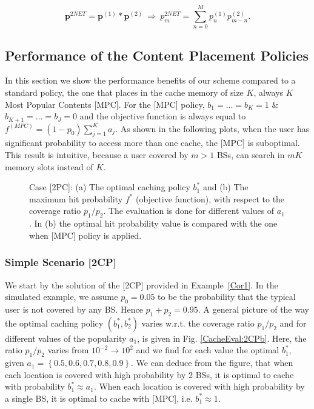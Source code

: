 \documentclass[conference,twocolum,final]{IEEEtran}
\begin{document}
\begin{equation}
\label{2Net}
\mathbf{p}^{2NET} = \mathbf{p}^{(1)}*\mathbf{p}^{(2)} \ \Rightarrow \  p_m^{2NET} = \sum_{n=0}^M p_n^{(1)}p_{m-n}^{(2)}.
\end{equation}


\subsection{Performance of the Content Placement Policies}
In this section 
we show the performance benefits of our scheme compared to a standard policy, the one that places in the cache memory of size $K$, always $K$ Most Popular Contents [MPC]. For the [MPC] policy, $b_1=\ldots=b_K=1$ $\&$ $b_{K+1}=\ldots=b_J=0$ and the objective function is always equal to $f^{(MPC)}=(1-p_0)\sum_{j=1}^K a_j$. 
As shown in the following plots, when the user has significant probability to access more than one cache, the [MPC] is suboptimal. This result is intuitive, because a user covered by $m>1$ BSs, can search in $mK$ memory slots instead of $K$. 

 \begin{figure}[t!]    
\centering  
\label{CacheEval}
\caption{Case [2PC]: (a) The optimal caching policy $b_1^*$ and (b) The maximum hit probability $f^*$ (objective function), with respect to the coverage ratio $p_1/p_2$. The evaluation is done for different values of $a_1$. In (b) the optimal hit probability value is compared with the one when [MPC] policy is applied.}
\end{figure} 



\subsubsection{Simple Scenario [2CP]}
We start by the solution of the [2CP] provided in Example~\ref{Cor1}.  In the simulated example, we assume $p_0=0.05$ to be the probability that the typical user is not covered by any BS. Hence $p_1+p_2=0.95$. A general picture of the way the optimal caching policy $\left(b_1^*,b_2^*\right)$ varies w.r.t. the coverage ratio $p_1/p_2$ and for different values of the popularity $a_1$, is given in Fig. \ref{CacheEval:2CPb}. Here, the ratio $p_1/p_2$ varies from $10^{-2}\rightarrow 10^2$ and we find for each value the optimal $b_1^*$, given $a_1=\left\{0.5,0.6,0.7,0.8,0.9\right\}$. We can deduce from the figure, that when each location is covered with high probability by 2 BSs, it is optimal to cache with probability $b_1^*\approx a_1$. When each location is covered with high probability by a single BS, it is optimal to cache with [MPC], i.e. $b_1^*\approx 1$. 
\end{document}
